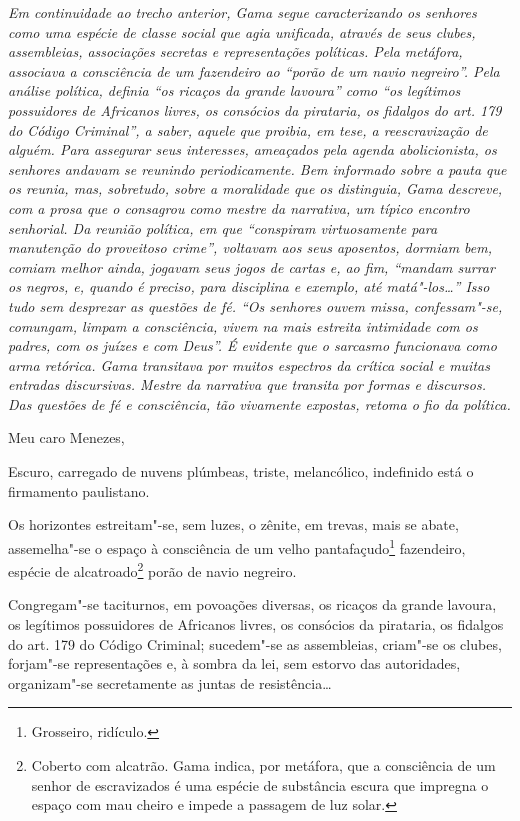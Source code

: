 \begin{flushleft}
{\footnotesize\itshape
Em continuidade ao trecho anterior, Gama segue caracterizando os
senhores como uma espécie de classe social que agia unificada, através
de seus clubes, assembleias, associações secretas e representações
políticas. Pela metáfora, associava a consciência de um fazendeiro ao
``porão de um navio negreiro''. Pela análise política, definia ``os ricaços
da grande lavoura'' como ``os legítimos possuidores de Africanos livres,
os consócios da pirataria, os fidalgos do art. 179 do Código Criminal'',
a saber, aquele que proibia, em tese, a reescravização de alguém. Para
assegurar seus interesses, ameaçados pela agenda abolicionista, os
senhores andavam se reunindo periodicamente. Bem informado sobre a pauta
que os reunia, mas, sobretudo, sobre a moralidade que os distinguia, Gama
descreve, com a prosa que o consagrou como mestre da narrativa, um
típico encontro senhorial. Da reunião política, em que ``conspiram
virtuosamente para manutenção do proveitoso crime'', voltavam aos seus
aposentos, dormiam bem, comiam melhor ainda, jogavam seus jogos de
cartas e, ao fim, ``mandam surrar os negros, e, quando é preciso, para
disciplina e exemplo, até matá"-los\ldots{}'' Isso tudo sem desprezar as
questões de fé. ``Os senhores ouvem missa, confessam"-se, comungam, limpam
a consciência, vivem na mais estreita intimidade com os padres, com os
juízes e com Deus''. É evidente que o sarcasmo funcionava como arma
retórica. Gama transitava por muitos espectros da crítica social e
muitas entradas discursivas. Mestre da
narrativa que transita por formas e discursos. Das questões de fé e
consciência, tão vivamente expostas, retoma o fio da política.}
\end{flushleft}\pagebreak

\noindent{}Meu caro Menezes,\smallskip

Escuro, carregado de nuvens plúmbeas, triste, melancólico, indefinido
está o firmamento paulistano.

Os horizontes estreitam"-se, sem luzes, o zênite, em trevas, mais se
abate, assemelha"-se o espaço à consciência de um velho
pantafaçudo\footnote{Grosseiro, ridículo.} fazendeiro, espécie de
alcatroado\footnote{Coberto com alcatrão. Gama indica, por metáfora,
  que a consciência de um senhor de escravizados é uma espécie de
  substância escura que impregna o espaço com mau cheiro e impede a
  passagem de luz solar.} porão de navio negreiro.

Congregam"-se taciturnos, em povoações diversas, os ricaços da grande
lavoura, os legítimos possuidores de Africanos livres, os consócios da
pirataria, os fidalgos do art. 179 do Código Criminal; sucedem"-se as
assembleias, criam"-se os clubes, forjam"-se representações e, à sombra da
lei, sem estorvo das autoridades, organizam"-se secretamente as juntas de
resistência\ldots{}

